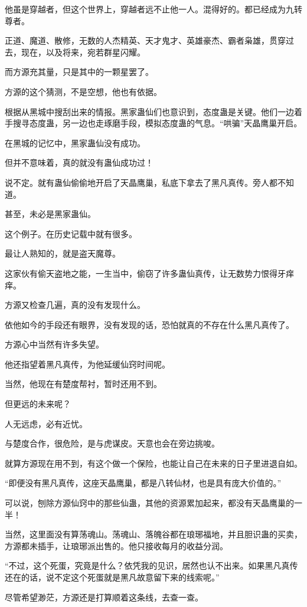 \begin{this_body}
他虽是穿越者，但这个世界上，穿越者远不止他一人。混得好的。都已经成为九转尊者。

正道、魔道、散修，无数的人杰精英、天才鬼才、英雄豪杰、霸者枭雄，贯穿过去，现在，以及将来，宛若群星闪耀。

而方源充其量，只是其中的一颗星罢了。

方源的这个猜测，不是空想，他也有依据。

根据从黑城中搜刮出来的情报。黑家蛊仙们也意识到，态度蛊是关键。他们一边着手搜寻态度蛊，另一边也走琢磨手段，模拟态度蛊的气息。“哄骗”天晶鹰巢开启。

在黑城的记忆中，黑家蛊仙没有成功。

但并不意味着，真的就没有蛊仙成功过！

说不定。就有蛊仙偷偷地开启了天晶鹰巢，私底下拿去了黑凡真传。旁人都不知道。

甚至，未必是黑家蛊仙。

这个例子。在历史记载中就有很多。

最让人熟知的，就是盗天魔尊。

这家伙有偷天盗地之能，一生当中，偷窃了许多蛊仙真传，让无数势力恨得牙痒痒。

方源又检查几遍，真的没有发现什么。

依他如今的手段还有眼界，没有发现的话，恐怕就真的不存在什么黑凡真传了。

方源心中当然有许多失望。

他还指望着黑凡真传，为他延缓仙窍时间呢。

当然，他现在有楚度帮衬，暂时还用不到。

但更远的未来呢？

人无远虑，必有近忧。

与楚度合作，很危险，是与虎谋皮。天意也会在旁边挑唆。

就算方源现在用不到，有这个做一个保险，也能让自己在未来的日子里进退自如。

“即便没有黑凡真传，这座天晶鹰巢，都是八转仙材，也是具有庞大价值的。”

可以说，刨除方源仙窍中的那些仙蛊，其他的资源累加起来，都没有天晶鹰巢的一半！

当然，这里面没有算荡魂山。荡魂山、落魄谷都在琅琊福地，并且胆识蛊的买卖，方源都未插手，让琅琊派出售的。他只接收每月的收益分润。

“不过，这个死蛋，究竟是什么？依凭我的见识，居然也认不出来。如果黑凡真传还在的话，说不定这个死蛋就是黑凡故意留下来的线索呢。”

尽管希望渺茫，方源还是打算顺着这条线，去查一查。


\end{this_body}
